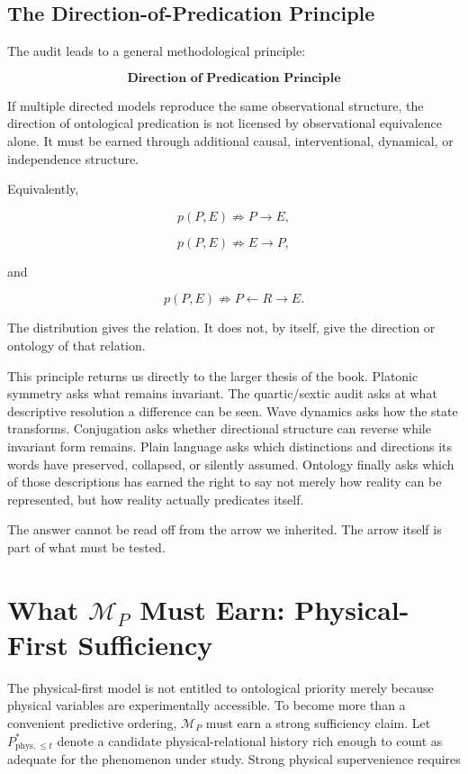 \subsection{The Direction-of-Predication Principle}

The audit leads to a general methodological principle:

\[
\boxed{
\textbf{Direction of Predication Principle}
}
\]

If multiple directed models reproduce the same observational structure, the direction of ontological predication is not licensed by observational equivalence alone. It must be earned through additional causal, interventional, dynamical, or independence structure.

Equivalently,

\[
\boxed{
p(P,E)\not\Rightarrow P\rightarrow E,
}
\]

\[
\boxed{
p(P,E)\not\Rightarrow E\rightarrow P,
}
\]

and

\[
\boxed{
p(P,E)\not\Rightarrow P\leftarrow R\rightarrow E.
}
\]

The distribution gives the relation. It does not, by itself, give the direction or ontology of that relation.

This principle returns us directly to the larger thesis of the book. Platonic symmetry asks what remains invariant. The quartic/sextic audit asks at what descriptive resolution a difference can be seen. Wave dynamics asks how the state transforms. Conjugation asks whether directional structure can reverse while invariant form remains. Plain language asks which distinctions and directions its words have preserved, collapsed, or silently assumed. Ontology finally asks which of those descriptions has earned the right to say not merely how reality can be represented, but how reality actually predicates itself.

The answer cannot be read off from the arrow we inherited. The arrow itself is part of what must be tested.

\section{What $\mathcal M_P$ Must Earn: Physical-First Sufficiency}

The physical-first model is not entitled to ontological priority merely because physical variables are experimentally accessible. To become more than a convenient predictive ordering, $\mathcal M_P$ must earn a strong sufficiency claim. Let $P_{\mathrm{phys},\le t}^{\ast}$ denote a candidate physical-relational history rich enough to count as adequate for the phenomenon under study. Strong physical supervenience requires

